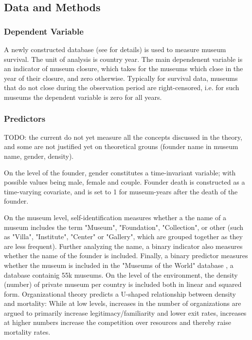 \documentclass[11pt]{article}
\begin{document}
\subsection*{Data and Methods}


\subsubsection*{Dependent Variable}

A newly constructed database (see \textcite{Velthuis_etal_2023_boom} for details) is used to measure museum survival.
The unit of analysis is country year.
The main dependenent variable is an indicator of museum closure, which takes for the museums which close in the year of their closure, and zero otherwise.
Typically for survival data, museums that do not close during the observation period are right-censored, i.e. for such museums the dependent variable is zero for all years.

\subsubsection*{Predictors}

TODO: the current do not yet measure all the concepts discussed in the theory, and some are not justified yet on theoretical grouns (founder name in museum name, gender, density).

\bigbreak
\noindent
On the level of the founder, gender constitutes a time-invariant variable; with possible values being male, female and couple.
Founder death is constructed as a time-varying covariate, and is set to 1 for museum-years after the death of the founder. 

On the museum level, self-identification measures whether a the name of a museum includes the term "Museum", "Foundation", "Collection", or other (such as "Villa", "Institute", "Center" or "Gallery", which are grouped together as they are less frequent).
Further analyzing the name, a binary indicator also measures whether the name of the founder is included.
Finally, a binary predictor measures whether the museum is included in the "Museums of the World" database \parencite{deGruyter_2021_MOW}, a database containig 55k museums.
On the level of the environment, the density (number) of private museum per country is included both in linear and squared form.
Organizational theory \parencite{hannan89_organ} predicts a U-shaped relationship between density and mortality: While at low levels, increases in the number of organizations are argued to primarily increase legitimacy/familiarity and lower exit rates, increases at higher numbers increase the competition over resources and thereby raise mortality rates.
\end{document}
